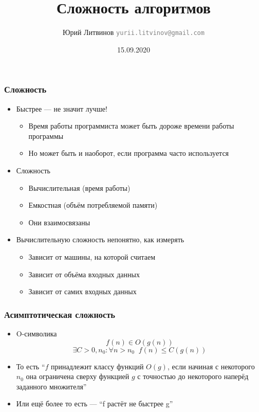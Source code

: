\documentclass[xetex,mathserif,serif]{beamer}
\title{Сложность алгоритмов}
\author[Юрий Литвинов]{Юрий Литвинов \newline \textcolor{gray}{\small\texttt{yurii.litvinov@gmail.com}}}
\date{15.09.2020}
\begin{document}
    
    \frame{\titlepage}
    
    \begin{frame}
        \frametitle{Сложность}
        \begin{itemize}
            \item Быстрее --- не значит лучше!
            \begin{itemize}
                \item Время работы программиста может быть дороже времени работы программы
                \item Но может быть и наоборот, если программа часто используется
            \end{itemize}
            \item Сложность
            \begin{itemize}
                \item Вычислительная (время работы)
                \item Емкостная (объём потребляемой памяти)
                \item Они взаимосвязаны
            \end{itemize}
            \item Вычислительную сложность непонятно, как измерять
            \begin{itemize}
                \item Зависит от машины, на которой считаем
                \item Зависит от объёма входных данных
                \item Зависит от самих входных данных
            \end{itemize}
        \end{itemize}
    \end{frame}

    \begin{frame}
        \frametitle{Асимптотическая сложность}
        \begin{itemize}
            \item O-символика
            $$f(n) \in O(g(n))$$
            $$\exists C > 0, n_0 : \forall n > n_0\;\; f(n) \leq C(g(n))$$
            \item То есть ``$f$ принадлежит классу функций $O(g)$, если начиная с некоторого $n_0$ она ограничена сверху функцией $g$ с точностью до некоторого наперёд заданного множителя''
            \item Или ещё более то есть --- ``f растёт не быстрее g''
        \end{itemize}
    \end{frame}
\end{document}
